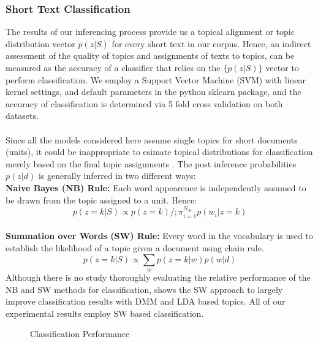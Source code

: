 \documentclass{sig-alternate-05-2015}
\begin{document}
\subsubsection{Short Text Classification} 
The results of our inferencing process provide us a topical alignment or topic distribution vector $p(z|S)$ for every short text in our corpus. Hence, an indirect assessment of the quality of topics and assignments of texts to topics, can be measured as the accuracy of a classifier that relies on the $\{p(z|S)\}$ vector to perform classification. We employ a Support Vector Machine (SVM) with linear kernel settings, and default parameters in the python sklearn package, and the accuracy of classification is determined via 5 fold cross validation on both datasets.
\\
\\
Since all the models considered here assume single topics for short documents (units), it could be inappropriate to esimate topical distributions for classification merely based on the final topic assignments \cite{gpudmm, btm}. The post inference probabilities $p(z|d)$ is generally inferred in two different ways:\\[4pt]
\textbf{Naive Bayes (NB) Rule:}
Each word appearence is independently assumed to be drawn from the topic assigned to a unit. Hence:
$$p(z=k |S) \propto p(z=k)/;\pi_{i=1}^{N_{S}}p(w_{i}|z=k)$$
\\
\textbf{Summation over Words (SW) Rule:}
Every word in the vocabulary is used to establish the likelihood of a topic given a document using chain rule.
$$p(z=k |S) \propto \sum_{w}p(z=k|w)p(w|d)$$
Although there is no study thoroughly evaluating the relative performance of the NB and SW methods for classification, \cite{satm} shows the SW approach to largely improve classification results with DMM and LDA based topics. All of our experimental results employ SW based classification.
\begin{figure}[t]
    \centering
    \caption{Classification Performance}
\end{figure}
\end{document}
